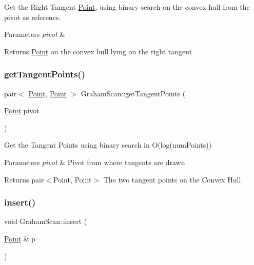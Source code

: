 Get the Right Tangent \mbox{\hyperlink{classPoint}{Point}}, using binary search on the convex hull from the pivot as reference. 


\begin{DoxyParams}{Parameters}
{\em pivot} & \\
\hline
\end{DoxyParams}
\begin{DoxyReturn}{Returns}
\mbox{\hyperlink{classPoint}{Point}} on the convex hull lying on the right tangent 
\end{DoxyReturn}
\mbox{\label{classGrahamScan_ae308d2013337902df55fa4feae2aec60}} 
\subsubsection{\texorpdfstring{get\+Tangent\+Points()}{getTangentPoints()}}
{\footnotesize\ttfamily pair$<$ \mbox{\hyperlink{classPoint}{Point}}, \mbox{\hyperlink{classPoint}{Point}} $>$ Graham\+Scan\+::get\+Tangent\+Points (\begin{DoxyParamCaption}\item[{\mbox{\hyperlink{classPoint}{Point}}}]{pivot }\end{DoxyParamCaption})}



Get the Tangent Points using binary search in O(log(num\+Points)) 


\begin{DoxyParams}{Parameters}
{\em pivot} & Pivot from where tangents are drawn \\
\hline
\end{DoxyParams}
\begin{DoxyReturn}{Returns}
pair$<$\+Point, Point$>$ The two tangent points on the Convex Hull 
\end{DoxyReturn}
\mbox{\label{classGrahamScan_a4996cb0d2deb3cd6f9cb3df99b91e7e8}} 
\subsubsection{\texorpdfstring{insert()}{insert()}}
{\footnotesize\ttfamily void Graham\+Scan\+::insert (\begin{DoxyParamCaption}\item[{\mbox{\hyperlink{classPoint}{Point}} \&}]{p }\end{DoxyParamCaption})\hspace{0.3cm}{\ttfamily [private]}}



